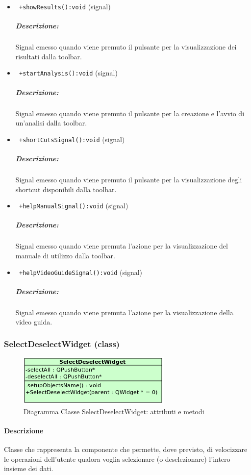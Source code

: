 \begin{itemize}
\item \color{blue}\verb! +showResults():void! (signal)
\color{black} 
\subparagraph{Descrizione:} Signal\g{} emesso quando viene premuto il pulsante per la visualizzazione dei risultati dalla toolbar.

\item \color{blue}\verb! +startAnalysis():void! (signal)
\color{black} 
\subparagraph{Descrizione:} Signal\g{} emesso quando viene premuto il pulsante per la creazione e l'avvio di un'analisi dalla toolbar.

\item \color{blue}\verb! +shortCutsSignal():void! (signal)
\color{black} 
\subparagraph{Descrizione:} Signal\g{} emesso quando viene premuto il pulsante per la visualizzazione degli shortcut disponibili dalla toolbar.

\item \color{blue}\verb! +helpManualSignal():void! (signal)
\color{black} 
\subparagraph{Descrizione:} Signal\g{} emesso quando viene premuta l'azione per la visualizzazione del manuale di utilizzo dalla toolbar.

\item \color{blue}\verb! +helpVideoGuideSignal():void! (signal)
\color{black} 
\subparagraph{Descrizione:} Signal\g{} emesso quando viene premuta l'azione per la visualizzazione della video guida.
\end{itemize}
\pagebreak
\color{black}


\subsubsection{SelectDeselectWidget (class)}
\label{speselDes}
\begin{figure}[!h]
\centering
			\includegraphics[width=0.5\linewidth]{./Content/Immagini/view/SelectDeselectWidget.png}
			\caption{Diagramma Classe SelectDeselectWidget: attributi e metodi}
			\label{cl_seldesel}
\end{figure}
\paragraph{Descrizione \\}
Classe che rappresenta la componente che permette, dove previsto, di velocizzare le operazioni dell'utente qualora voglia selezionare (o deselezionare) l'intero insieme dei dati.
